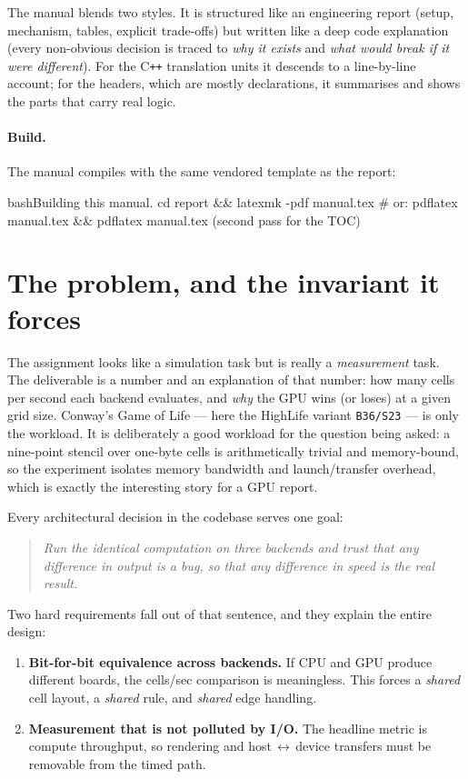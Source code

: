 \documentclass[
	english,
	letterpaper, oneside
]{article}
\begin{document}
The manual blends two styles. It is structured like an engineering report
(setup, mechanism, tables, explicit trade-offs) but written like a deep code
explanation (every non-obvious decision is traced to \emph{why it exists} and
\emph{what would break if it were different}). For the C\texttt{++} translation
units it descends to a line-by-line account; for the headers, which are mostly
declarations, it summarises and shows the parts that carry real logic.

\paragraph{Build.} The manual compiles with the same vendored template as the
report:

\begin{sourcecode}{bash}{Building this manual.}
cd report && latexmk -pdf manual.tex
# or: pdflatex manual.tex && pdflatex manual.tex   (second pass for the TOC)
\end{sourcecode}

\section{The problem, and the invariant it forces}
\label{sec:problem}

The assignment looks like a simulation task but is really a \emph{measurement}
task. The deliverable is a number and an explanation of that number: how many
cells per second each backend evaluates, and \emph{why} the GPU wins (or loses)
at a given grid size. Conway's Game of Life --- here the HighLife variant
\texttt{B36/S23} --- is only the workload. It is deliberately a good workload
for the question being asked: a nine-point stencil over one-byte cells is
arithmetically trivial and memory-bound, so the experiment isolates memory
bandwidth and launch/transfer overhead, which is exactly the interesting story
for a GPU report.

Every architectural decision in the codebase serves one goal:

\begin{quote}
	\emph{Run the identical computation on three backends and trust that any
	difference in output is a bug, so that any difference in speed is the real
	result.}
\end{quote}

Two hard requirements fall out of that sentence, and they explain the entire
design:

\begin{enumerate}
	\item \textbf{Bit-for-bit equivalence across backends.} If CPU and GPU
	      produce different boards, the cells/sec comparison is meaningless.
	      This forces a \emph{shared} cell layout, a \emph{shared} rule, and
	      \emph{shared} edge handling.
	\item \textbf{Measurement that is not polluted by I/O.} The headline metric
	      is compute throughput, so rendering and host\,$\leftrightarrow$\,device
	      transfers must be removable from the timed path.
\end{enumerate}
\end{document}
